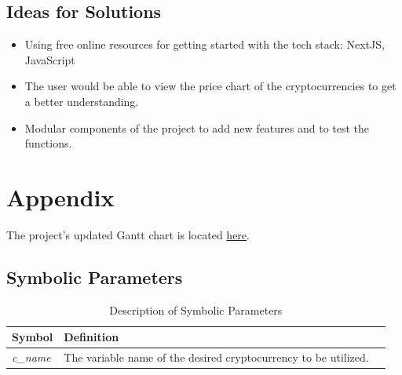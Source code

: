 \documentclass[12pt, titlepage]{article}
\begin{document}
\subsection{Ideas for Solutions}
\begin{itemize}
    \item Using free online resources for getting started with the tech stack: NextJS, JavaScript
    \item The user would be able to view the price chart of the cryptocurrencies to get a better understanding. 
    \item Modular components of the project to add new features and to test the functions. 
\end{itemize}

\newpage

\section{Appendix}

The project's updated Gantt chart is located \href{https://gitlab.cas.mcmaster.ca/webapp/webapp_l02_grp15/-/tree/main/ProjectSchedule}{here}.

\subsection{Symbolic Parameters}

\begin{table}[!h]
    \begin{tabular}{lll} \toprule
        \textbf{Symbol} & \textbf{Definition}\\ \midrule
        \textit{c\_name} & The variable name of the desired cryptocurrency to be utilized. \\ 
        \bottomrule
    \end{tabular}
    \caption{Description of Symbolic Parameters}
    \label{tab:my_label}
\end{table}


\nocite{*}

\end{document}
